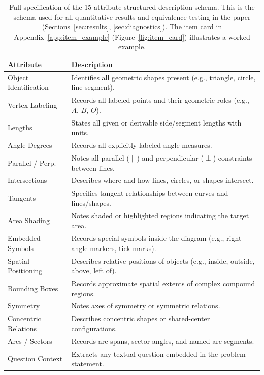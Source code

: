 \documentclass[11pt]{article}
\begin{document}
\begin{table}[t]
\centering\small
\begin{tabular}{@{}p{3.2cm}p{11.5cm}@{}}
\toprule
\textbf{Attribute} & \textbf{Description} \\
\midrule
Object Identification & Identifies all geometric shapes present (e.g., triangle, circle, line segment). \\
Vertex Labeling & Records all labeled points and their geometric roles (e.g., $A$, $B$, $O$). \\
Lengths & States all given or derivable side/segment lengths with units. \\
Angle Degrees & Records all explicitly labeled angle measures. \\
Parallel / Perp. & Notes all parallel ($\parallel$) and perpendicular ($\perp$) constraints between lines. \\
Intersections & Describes where and how lines, circles, or shapes intersect. \\
Tangents & Specifies tangent relationships between curves and lines/shapes. \\
Area Shading & Notes shaded or highlighted regions indicating the target area. \\
Embedded Symbols & Records special symbols inside the diagram (e.g., right-angle markers, tick marks). \\
Spatial Positioning & Describes relative positions of objects (e.g., inside, outside, above, left of). \\
Bounding Boxes & Records approximate spatial extents of complex compound regions. \\
Symmetry & Notes axes of symmetry or symmetric relations. \\
Concentric Relations & Describes concentric shapes or shared-center configurations. \\
Arcs / Sectors & Records arc spans, sector angles, and named arc segments. \\
Question Context & Extracts any textual question embedded in the problem statement. \\
\bottomrule
\end{tabular}
\caption{Full specification of the 15-attribute structured description schema. This is the schema used for all quantitative results and equivalence testing in the paper (Sections~\ref{sec:results}, \ref{sec:diagnostics}). The item card in Appendix~\ref{app:item_example} (Figure~\ref{fig:item_card}) illustrates a worked example.}
\label{tab:schema}
\end{table}
\end{document}
